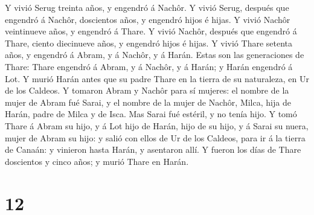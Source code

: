  Y vivió Serug treinta años, y engendró á Nachôr.
 Y vivió Serug, después que engendró á Nachôr, doscientos
años, y engendró hijos é hijas.  Y vivió Nachôr veintinueve
años, y engendró á Thare.  Y vivió Nachôr, después que
engendró á Thare, ciento diecinueve años, y engendró hijos é hijas.
 Y vivió Thare setenta años, y engendró á Abram, y á
Nachôr, y á Harán.  Estas son las generaciones de Thare:
Thare engendró á Abram, y á Nachôr, y á Harán; y Harán engendró á Lot.
 Y murió Harán antes que su padre Thare en la tierra de su
naturaleza, en Ur de los Caldeos.  Y tomaron Abram y Nachôr
para sí mujeres: el nombre de la mujer de Abram fué Sarai, y el nombre
de la mujer de Nachôr, Milca, hija de Harán, padre de Milca y de Isca.
 Mas Sarai fué estéril, y no tenía hijo.  Y
tomó Thare á Abram su hijo, y á Lot hijo de Harán, hijo de su hijo, y á
Sarai su nuera, mujer de Abram su hijo: y salió con ellos de Ur de los
Caldeos, para ir á la tierra de Canaán: y vinieron hasta Harán, y
asentaron allí.  Y fueron los días de Thare doscientos y
cinco años; y murió Thare en Harán.

\hypertarget{section-11}{%
\section{12}\label{section-11}}

